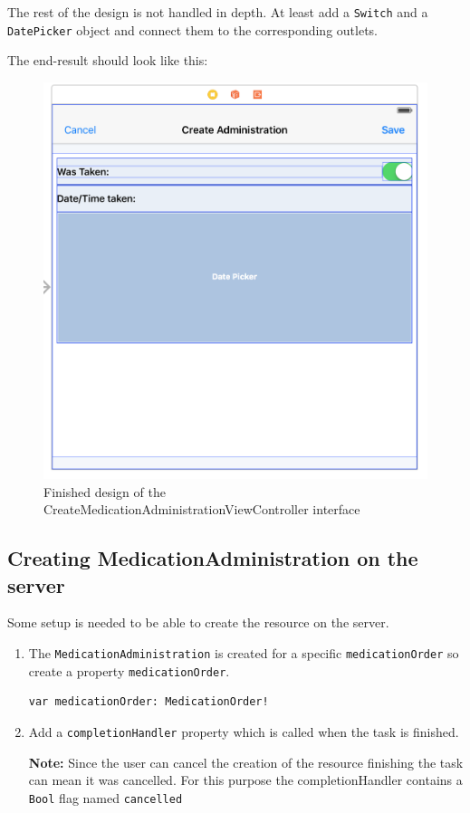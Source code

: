 \documentclass{article}
\begin{document}
The rest of the design is not handled in depth. At least add a
\texttt{Switch} and a \texttt{DatePicker} object and connect them to the
corresponding outlets.

The end-result should look like this:
\begin{figure}[H]
\centering
\includegraphics[width=\linewidth]{resources/step8/create_administration.png}
\caption{Finished design of the CreateMedicationAdministrationViewController interface}
\label{fig:create_administration}
\end{figure}

\subsection{Creating MedicationAdministration on the server}\label{step-8.2---implementing-createmedicationadministrationviewcontroller---creating-the-medicationadministration-on-the-server.}

Some setup is needed to be able to create the resource on the server.

\begin{enumerate}
\item
  The \texttt{MedicationAdministration} is created for a specific
  \texttt{medicationOrder} so create a property
  \texttt{medicationOrder}.

\begin{verbatim}
var medicationOrder: MedicationOrder!
\end{verbatim}
\item
  Add a \texttt{completionHandler} property which is called when the
  task is finished.

  \textbf{Note:} Since the user can
  cancel the creation of the resource finishing the task can mean it was
  cancelled.
  For this purpose the completionHandler
  contains a \texttt{Bool} flag named \texttt{cancelled}
\end{enumerate}
\end{document}
